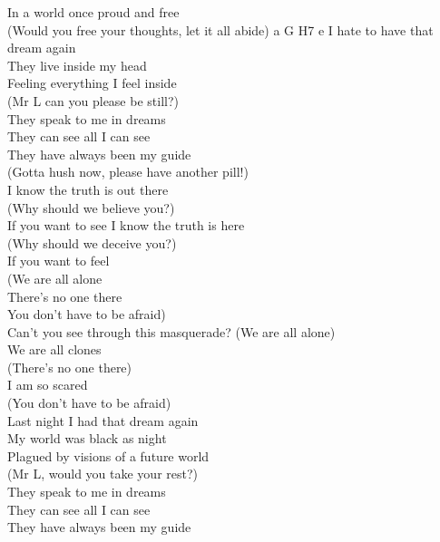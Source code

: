 In a world once proud and free\tab{}\\
(Would you free your thoughts, let it all abide) a G H7 e
\hop
I hate to have that dream again\\
They live inside my head\tab{}\\
Feeling everything I feel inside\tab{}\\
(Mr L can you please be still?)\tab{}\\
They speak to me in dreams\tab{}\\
They can see all I can see\tab{}\\
They have always been my guide\\
(Gotta hush now, please have another pill!)
\hops
\tab{}\tab{}\\
 I know the truth is out there\\
 (Why should we believe you?)\\
 If you want to see\tab{}
\hop
{} I know the truth is here\tab{}\\
 (Why should we deceive you?)\\
 If you want to feel\tab{}\\
\hops
(We are all alone\tab{}\\
There's no one there\tab{}\\
You don't have to be afraid)\tab{}\\
\hop
Can't you see through this masquerade?\hop
(We are all alone)\tab{}\\
We are all clones\tab{}\\
(There's no one there)\tab{}\\
I am so scared\tab{}\tab{}\\
(You don't have to be afraid)\tab{}\\
\hops
Last night I had that dream again\\
My world was black as night\tab{}\\
Plagued by visions of a future world\\
(Mr L, would you take your rest?)\\
\hop
They speak to me in dreams\tab{}\\
They can see all I can see\tab{}\\
They have always been my guide\\
